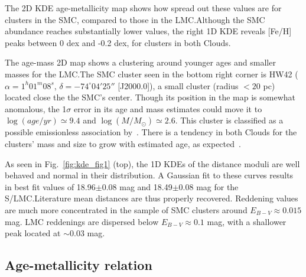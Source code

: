 \documentclass[draft]{aa}
\begin{document}
The 2D KDE age-metallicity map shows how spread out these values are for
clusters in the SMC, compared to those in the LMC.\@ Although the SMC abundance
reaches substantially lower values, the right 1D KDE reveals [Fe/H] peaks
between 0 dex and -0.2 dex, for clusters in both Clouds.

The age-mass 2D map shows a clustering around younger ages and smaller masses
for the LMC.\@ The SMC cluster seen in the bottom right corner is HW42
($\alpha{=}1^h01^m08^s$, $\delta{=}-74^\circ04'25''$ [J2000.0]),
a small cluster (radius ${<}20$ pc) located close the the SMC's center. Though
its position in the map is somewhat anomalous, the 1$\sigma$ error in its age
and mass estimates could move it to
$\log(age/yr){\simeq}9.4$ and $\log(M/M_{\odot}){\simeq}2.6$. This cluster is
classified as a possible emissionless association by~\mbox{\cite{Bica_1995}}.
%
There is a tendency in both Clouds for the clusters' mass and size to
grow with estimated age, as expected~\citep[due to the mass-to-light ratio
increase with age; see][Sect. 4]{Popescu_2012}.

As seen in Fig.~\ref{fig:kde_fig1} (top), the 1D KDEs of the distance
moduli are well behaved and normal in their distribution.
A Gaussian fit to these curves results in best fit values of 18.96$\pm$0.08 mag
and 18.49$\pm$0.08 mag for the S/LMC.\@ Literature mean distances are thus
properly recovered.
%
Reddening values are much more concentrated in the sample of SMC clusters
around $E_{B-V}{\approx}0.015$ mag. LMC reddenings are dispersed below $E_{B-V}
{\approx}0.1$ mag, with a shallower peak located at ${\sim}0.03$ mag.
%


\subsection{Age-metallicity relation}
\label{ssec:amr}
\end{document}
